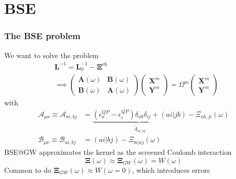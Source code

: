\section{BSE}
\begin{frame}
    \frametitle{The BSE problem}
We want to solve the problem
\begin{align}
&\bm{L}^{-1} = \bm{L}_0^{-1} - \bm{\Xi}^{\mathrm{eh}} \\
        &\implies \begin{pmatrix}
        \mathcal{\bm{A}}(\omega ) & \mathcal{\bm{B}}(\omega ) \\
        \mathcal{\bm{B}}(\omega ) & \mathcal{\bm{A}}(\omega )
    \end{pmatrix}
\begin{pmatrix}
    \bm{X}^m \\
\bm{Y}^m
\end{pmatrix}
=
\Omega ^m
\begin{pmatrix}
    \bm{X}^m \\
\bm{Y}^m
\end{pmatrix}
\end{align}
with
\begin{align}
\label{a}
\mathcal{A}_{\mu \nu} \equiv \mathcal{A}_{ai,bj} &= \underbrace{\left( \epsilon_a^{QP} - \epsilon_i^{QP} \right) \delta_{ab} \delta_{ij} + (ai|jb)}_{\tilde{A}_{ai,bj}} - {\Xi}_{ab,ji}(\omega) \\
\mathcal{B}_{\mu \nu} \equiv \mathcal{B}_{ai,bj} &= (ai|bj) - {\Xi}_{bi|aj}(\omega)
\end{align}
 BSE@GW approximates the kernel as the screened Coulomb interaction
\begin{equation}
    \bm{\Xi}(\omega ) \approx \bm{\Xi}_{GW}(\omega ) = W(\omega )
\end{equation}
Common to do $\bm{\Xi}_{GW}(\omega ) \approx W(\omega=0)$, which introduces errors
\end{frame}

